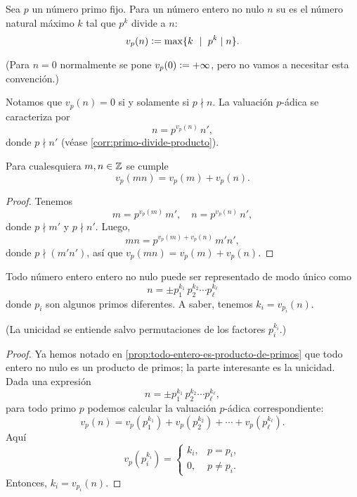 \documentclass{article}
\numberwithin{equation}{section}
\begin{document}
\begin{definicion}
  Sea $p$ un número primo fijo. Para un número entero no nulo $n$ su
   es el número natural
  máximo $k$ tal que $p^k$ divide a $n$:
  $$v_p (n) \mathrel{\mathop:}= \max \{ k ~ \mid ~ p^k \mid n \}.$$
\end{definicion}

\noindent (Para $n = 0$ normalmente se pone $v_p (0) \mathrel{\mathop:}= +\infty$, pero no
vamos a necesitar esta convención.)

Notamos que $v_p (n) = 0$ si y solamente si $p\nmid n$. La valuación $p$-ádica
se caracteriza por
$$n = p^{v_p (n)}\,n',$$
donde $p\nmid n'$ (véase \ref{corr:primo-divide-producto}).

\begin{lema}
  Para cualesquiera $m,n\in\mathbb{Z}$ se cumple
  $$v_p (mn) = v_p (m) + v_p (n).$$

  \begin{proof}
    Tenemos
    $$m = p^{v_p (m)}\,m', \quad n = p^{v_p (n)}\,n',$$
    donde $p\nmid m'$ y $p\nmid n'$. Luego,
    $$mn = p^{v_p (m) + v_p (n)}\,m' n',$$
    donde $p\nmid (m'n')$, así que $v_p (mn) = v_p (m) + v_p (n)$.
  \end{proof}
\end{lema}

\begin{teorema}
  Todo número entero entero no nulo puede ser representado de modo único como
  $$n = \pm p_1^{k_1}\,p_2^{k_2}\cdots p_\ell^{k_\ell}$$
  donde $p_i$ son algunos primos diferentes. A saber, tenemos
  $k_i = v_{p_i} (n)$.
\end{teorema}

\noindent (La unicidad se entiende salvo permutaciones de los factores
$p_i^{k_i}$.)

\begin{proof}
  Ya hemos notado en \ref{prop:todo-entero-es-producto-de-primos} que todo
  entero no nulo es un producto de primos; la parte interesante es la
  unicidad. Dada una expresión
  $$n = \pm p_1^{k_1}\,p_2^{k_2}\cdots p_\ell^{k_\ell},$$
  para todo primo $p$ podemos calcular la valuación $p$-ádica correspondiente:
  $$v_p (n) = v_p (p_1^{k_1}) + v_p (p_2^{k_2}) + \cdots + v_p (p_\ell^{k_\ell}).$$
  Aquí
  $$v_p (p_i^{k_i}) = \begin{cases}
    k_i, & p = p_i,\\
    0, & p \ne p_i.
  \end{cases}$$
  Entonces, $k_i = v_{p_i} (n)$.
\end{proof}
\end{document}
